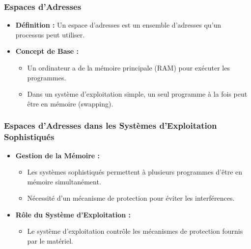 \documentclass[10pt]{beamer}
\begin{document}
\begin{frame}
    \frametitle{Espaces d'Adresses}
    \begin{itemize}
        \item \textbf{Définition :} Un espace d'adresses est un ensemble
              d'adresses
              qu'un processus peut utiliser.
        \item \textbf{Concept de Base :}
              \begin{itemize}
                  \item Un ordinateur a de la mémoire principale (RAM) pour
                        exécuter les
                        programmes.
                  \item Dans un système d'exploitation simple, un seul
                        programme à la
                        fois peut être en mémoire (swapping).
              \end{itemize}
    \end{itemize}
\end{frame}

\begin{frame}
    \frametitle{Espaces d'Adresses dans les Systèmes d'Exploitation
        Sophistiqués}
    \begin{itemize}
        \item \textbf{Gestion de la Mémoire :}
              \begin{itemize}
                  \item Les systèmes sophistiqués permettent à plusieurs
                        programmes
                        d'être en mémoire simultanément.
                  \item Nécessité d'un mécanisme de protection pour éviter les
                        interférences.
              \end{itemize}
        \item \textbf{Rôle du Système d'Exploitation :}
              \begin{itemize}
                  \item Le système d'exploitation contrôle les mécanismes de
                        protection
                        fournis par le matériel.
              \end{itemize}
    \end{itemize}
\end{frame}
\end{document}
